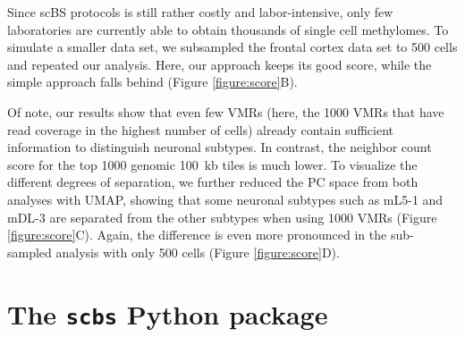 \documentclass[twocolumn,10pt]{article}
\begin{document}
Since scBS protocols is still rather costly and labor-intensive, only few laboratories are currently able to obtain thousands of single cell methylomes.
To simulate a smaller data set, we subsampled the frontal cortex data set to 500 cells and repeated our analysis.
Here, our approach keeps its good score, while the simple approach falls behind (Figure \ref{figure:score}B).

Of note, our results show that even few VMRs (here, the 1000 VMRs that have read coverage in the highest number of cells) already contain sufficient information to distinguish neuronal subtypes.
In contrast, the neighbor count score for the top 1000 genomic 100~kb tiles is much lower.
To visualize the different degrees of separation, we further reduced the PC space from both analyses with UMAP, showing that some neuronal subtypes such as mL5-1 and mDL-3 are separated from the other subtypes when using 1000 VMRs (Figure \ref{figure:score}C).
Again, the difference is even more pronounced in the sub-sampled analysis with only 500 cells (Figure \ref{figure:score}D).

\section{The \texttt{scbs} Python package}
\end{document}
